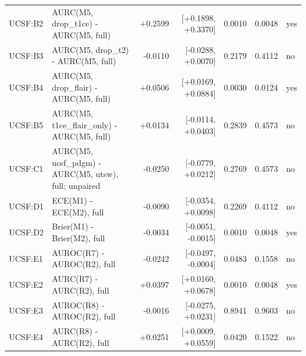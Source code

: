 \begin{tabular}{llrrrrl}
UCSF:B2 & AURC(M5, drop\_t1ce) - AURC(M5, full) & +0.2599 & [+0.1898, +0.3370] & 0.0010 & 0.0048 & yes \\
UCSF:B3 & AURC(M5, drop\_t2) - AURC(M5, full) & -0.0110 & [-0.0288, +0.0070] & 0.2179 & 0.4112 & no \\
UCSF:B4 & AURC(M5, drop\_flair) - AURC(M5, full) & +0.0506 & [+0.0169, +0.0884] & 0.0030 & 0.0124 & yes \\
UCSF:B5 & AURC(M5, t1ce\_flair\_only) - AURC(M5, full) & +0.0134 & [-0.0114, +0.0403] & 0.2839 & 0.4573 & no \\
UCSF:C1 & AURC(M5, ucsf\_pdgm) - AURC(M5, utsw), full; unpaired & -0.0250 & [-0.0779, +0.0212] & 0.2769 & 0.4573 & no \\
UCSF:D1 & ECE(M1) - ECE(M2), full & -0.0090 & [-0.0354, +0.0098] & 0.2269 & 0.4112 & no \\
UCSF:D2 & Brier(M1) - Brier(M2), full & -0.0034 & [-0.0051, -0.0015] & 0.0010 & 0.0048 & yes \\
UCSF:E1 & AUROC(R7) - AUROC(R2), full & -0.0242 & [-0.0497, -0.0004] & 0.0483 & 0.1558 & no \\
UCSF:E2 & AURC(R7) - AURC(R2), full & +0.0397 & [+0.0160, +0.0678] & 0.0010 & 0.0048 & yes \\
UCSF:E3 & AUROC(R8) - AUROC(R2), full & -0.0016 & [-0.0275, +0.0231] & 0.8941 & 0.9603 & no \\
UCSF:E4 & AURC(R8) - AURC(R2), full & +0.0251 & [+0.0009, +0.0559] & 0.0420 & 0.1522 & no \\
\bottomrule
\end{tabular}

